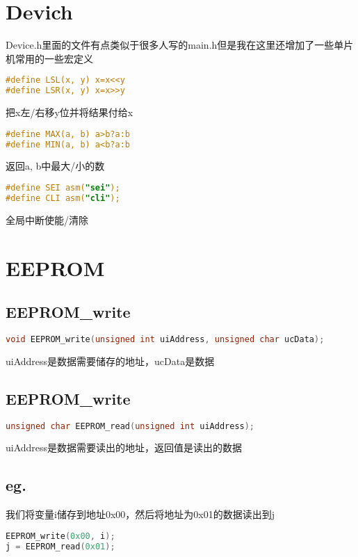 \documentclass{report}
\begin{document}
\section{Devich}
Device.h里面的文件有点类似于很多人写的main.h但是我在这里还增加了一些单片机常用的一些宏定义
\begin{lstlisting}[language=C]
#define LSL(x, y) x=x<<y
#define LSR(x, y) x=x>>y
\end{lstlisting}
把x左/右移y位并将结果付给x
\begin{lstlisting}[language=C]
#define MAX(a, b) a>b?a:b
#define MIN(a, b) a<b?a:b
\end{lstlisting}
返回a, b中最大/小的数
\begin{lstlisting}[language=C]
#define SEI asm("sei");
#define CLI asm("cli");
\end{lstlisting}
全局中断使能/清除
\section{EEPROM}
\subsection{EEPROM\_write}
\begin{lstlisting}[language=C]
void EEPROM_write(unsigned int uiAddress, unsigned char ucData);
\end{lstlisting}
uiAddress是数据需要储存的地址，ucData是数据
\subsection{EEPROM\_write}
\begin{lstlisting}[language=C]
unsigned char EEPROM_read(unsigned int uiAddress);
\end{lstlisting}
uiAddress是数据需要读出的地址，返回值是读出的数据
\subsection{eg.}
我们将变量i储存到地址0x00，然后将地址为0x01的数据读出到j
\begin{lstlisting}[language=C]
EEPROM_write(0x00, i);
j = EEPROM_read(0x01);
\end{lstlisting}
\end{document}
